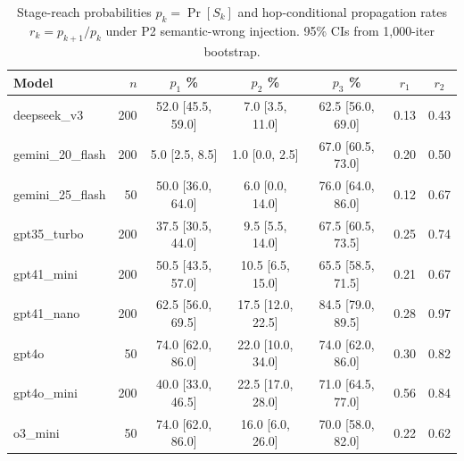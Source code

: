 \begin{table}[t]
\centering\small
\caption{Stage-reach probabilities $p_k=\Pr[S_k]$ and hop-conditional propagation rates $r_k=p_{k+1}/p_k$ under P2 semantic-wrong injection. 95\% CIs from 1,000-iter bootstrap.}
\label{tab:hop}
\begin{tabular}{lrccccc}
\toprule
Model & $n$ & $p_1$ \% & $p_2$ \% & $p_3$ \% & $r_1$ & $r_2$ \\
\midrule
deepseek\_v3 & 200 & 52.0 [45.5, 59.0] & 7.0 [3.5, 11.0] & 62.5 [56.0, 69.0] & 0.13 & 0.43 \\
gemini\_20\_flash & 200 & 5.0 [2.5, 8.5] & 1.0 [0.0, 2.5] & 67.0 [60.5, 73.0] & 0.20 & 0.50 \\
gemini\_25\_flash & 50 & 50.0 [36.0, 64.0] & 6.0 [0.0, 14.0] & 76.0 [64.0, 86.0] & 0.12 & 0.67 \\
gpt35\_turbo & 200 & 37.5 [30.5, 44.0] & 9.5 [5.5, 14.0] & 67.5 [60.5, 73.5] & 0.25 & 0.74 \\
gpt41\_mini & 200 & 50.5 [43.5, 57.0] & 10.5 [6.5, 15.0] & 65.5 [58.5, 71.5] & 0.21 & 0.67 \\
gpt41\_nano & 200 & 62.5 [56.0, 69.5] & 17.5 [12.0, 22.5] & 84.5 [79.0, 89.5] & 0.28 & 0.97 \\
gpt4o & 50 & 74.0 [62.0, 86.0] & 22.0 [10.0, 34.0] & 74.0 [62.0, 86.0] & 0.30 & 0.82 \\
gpt4o\_mini & 200 & 40.0 [33.0, 46.5] & 22.5 [17.0, 28.0] & 71.0 [64.5, 77.0] & 0.56 & 0.84 \\
o3\_mini & 50 & 74.0 [62.0, 86.0] & 16.0 [6.0, 26.0] & 70.0 [58.0, 82.0] & 0.22 & 0.62 \\
\bottomrule
\end{tabular}
\end{table}